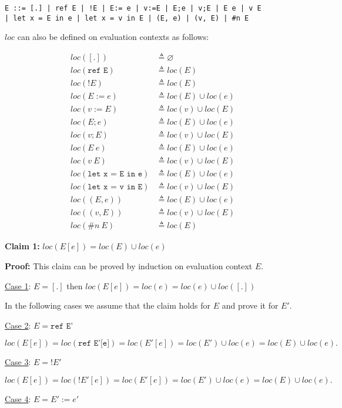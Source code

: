 \documentclass[10pt]{article}
\begin{document}
\begin{enumerate} [(a)]
    \texttt{E ::= [.] | ref E | !E | E:= e | v:=E | E;e | v;E | E e | v E \\
    | let x = E in e | let x = v in E | (E, e) | (v, E) | \#n E}

    $loc$ can also be defined on evaluation contexts as follows:

    \begin{align*}
    loc([.]) &\triangleq \varnothing\\
    loc(\texttt{ref E}) &\triangleq loc(E)\\
    loc(!E) &\triangleq loc(E)\\
    loc(E:=e) &\triangleq loc(E) \cup loc(e)\\
    loc(v:=E) &\triangleq loc(v) \cup loc(E)\\
    loc(E;e) &\triangleq loc(E) \cup loc(e)\\
    loc(v;E) &\triangleq loc(v) \cup loc(E)\\
    loc(E~e) &\triangleq loc(E)\cup loc(e)\\
    loc(v~E) &\triangleq loc(v) \cup loc(E)\\
    loc(\texttt{let x = E in e}) &\triangleq loc(E) \cup loc(e)\\
    loc(\texttt{let x = v in E}) &\triangleq loc(v) \cup loc(E)\\
    loc((E,e)) &\triangleq loc(E) \cup loc(e)\\
    loc((v,E)) &\triangleq loc(v) \cup loc(E)\\
    loc(\#n~E) &\triangleq loc(E)
    \end{align*}

    \textbf{Claim 1:} $loc(E[e]) = loc(E) \cup loc(e)$

    \textbf{Proof:} This claim can be proved by induction on evaluation context $E$. 

    \underline{Case 1}: $E = [.]$ then $loc(E[e]) = loc(e) = loc(e) \cup loc([.])$

    In the following cases we assume that the claim holds for $E$ and prove it for $E'$.

    \underline{Case 2}: $E = \texttt{ref E'}$

    $loc(E[e]) = loc(\texttt{ref E'[e]}) = loc(E'[e]) = loc(E') \cup loc(e) = loc(E) \cup loc(e).$

    \underline{Case 3}: $E = !E'$

    $loc(E[e]) = loc(!E'[e]) = loc(E'[e]) = loc(E') \cup loc(e) = loc(E) \cup loc(e).$

    \underline{Case 4}: $E = E':=e'$


\end{enumerate}
\end{document}
